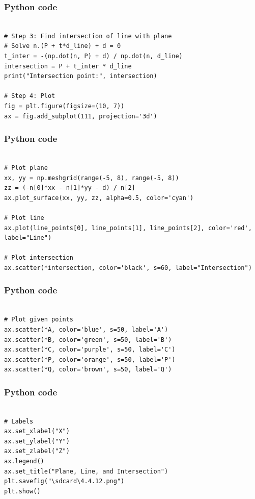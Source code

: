 \documentclass{beamer}
\begin{document}
\begin{frame}[fragile]
    \frametitle{Python code}
    \begin{lstlisting}

# Step 3: Find intersection of line with plane
# Solve n.(P + t*d_line) + d = 0
t_inter = -(np.dot(n, P) + d) / np.dot(n, d_line)
intersection = P + t_inter * d_line
print("Intersection point:", intersection)

# Step 4: Plot
fig = plt.figure(figsize=(10, 7))
ax = fig.add_subplot(111, projection='3d')
\end{lstlisting}
 
\end{frame}
\begin{frame}[fragile]
    \frametitle{Python code}
    \begin{lstlisting}

# Plot plane
xx, yy = np.meshgrid(range(-5, 8), range(-5, 8))
zz = (-n[0]*xx - n[1]*yy - d) / n[2]
ax.plot_surface(xx, yy, zz, alpha=0.5, color='cyan')

# Plot line
ax.plot(line_points[0], line_points[1], line_points[2], color='red', label="Line")

# Plot intersection
ax.scatter(*intersection, color='black', s=60, label="Intersection")
\end{lstlisting}
 
\end{frame}
\begin{frame}[fragile]
    \frametitle{Python code}
    \begin{lstlisting}

# Plot given points
ax.scatter(*A, color='blue', s=50, label='A')
ax.scatter(*B, color='green', s=50, label='B')
ax.scatter(*C, color='purple', s=50, label='C')
ax.scatter(*P, color='orange', s=50, label='P')
ax.scatter(*Q, color='brown', s=50, label='Q')
\end{lstlisting}
 
\end{frame}
\begin{frame}[fragile]
    \frametitle{Python code}
    \begin{lstlisting}

# Labels
ax.set_xlabel("X")
ax.set_ylabel("Y")
ax.set_zlabel("Z")
ax.legend()
ax.set_title("Plane, Line, and Intersection")
plt.savefig("\sdcard\4.4.12.png")
plt.show()

\end{lstlisting}
 \end{frame}
\end{document}
